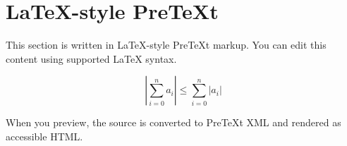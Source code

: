 \section{LaTeX-style PreTeXt}\label{tryit-latex}

This section is written in LaTeX-style PreTeXt markup. You can edit this content using supported LaTeX syntax.

\[
    \left|\sum_{i=0}^n a_i\right|\leq\sum_{i=0}^n |a_i|
\]

When you preview, the source is converted to PreTeXt XML and rendered as accessible HTML.
